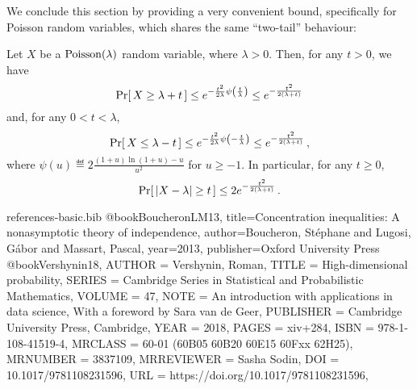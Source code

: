 \documentclass[10pt]{article}
\begin{document}
We conclude this section by providing a very convenient bound, specifically for Poisson random variables, which shares the same ``two-tail'' behaviour:
\begin{theorem}\label{theo:main:poisson:bounds}
Let $X$ be a $\poisson{\lambda}$ random variable, where $\lambda > 0$. Then, for any $t>0$, we have
\begin{equation}\label{eq:poisson:upper:tail}
    \probaOf{ X \geq \lambda + t} \leq e^{-\frac{t^2}{2\lambda}\psi\Paren{\frac{t}{\lambda}}} \leq e^{-\frac{t^2}{2(\lambda+t)}}
\end{equation}
and, for any $0<t< \lambda$,
\begin{equation}\label{eq:poisson:lower:tail}
  \probaOf{ X \leq \lambda - t} \leq e^{-\frac{t^2}{2\lambda}\psi\Paren{-\frac{t}{\lambda}}} \leq e^{-\frac{t^2}{2(\lambda+t)}}\,,
\end{equation}
where $\psi(u)\eqdef 2\frac{(1+u)\ln(1+u)-u}{u^2}$ for $u\geq -1$.
In particular, for any $t\geq 0$,
\begin{equation}\label{eq:poisson:both:tail}
  \probaOf{ \abs{X -\lambda} \geq t} \leq 2e^{-\frac{t^2}{2(\lambda+t)}}\,.
\end{equation}
\end{theorem}
\begin{filecontents}{references-basic.bib}
@book{BoucheronLM13,
  title={Concentration inequalities: A nonasymptotic theory of independence},
  author={Boucheron, St{\'e}phane and Lugosi, G{\'a}bor and Massart, Pascal},
  year={2013},
  publisher={Oxford University Press}
}
@book{Vershynin18,
    AUTHOR = {Vershynin, Roman},
     TITLE = {High-dimensional probability},
    SERIES = {Cambridge Series in Statistical and Probabilistic Mathematics},
    VOLUME = {47},
      NOTE = {An introduction with applications in data science,
              With a foreword by Sara van de Geer},
 PUBLISHER = {Cambridge University Press, Cambridge},
      YEAR = {2018},
     PAGES = {xiv+284},
      ISBN = {978-1-108-41519-4},
   MRCLASS = {60-01 (60B05 60B20 60E15 60Fxx 62H25)},
  MRNUMBER = {3837109},
MRREVIEWER = {Sasha Sodin},
       DOI = {10.1017/9781108231596},
       URL = {https://doi.org/10.1017/9781108231596},
}
\end{filecontents}
\printbibliography
\end{document}
